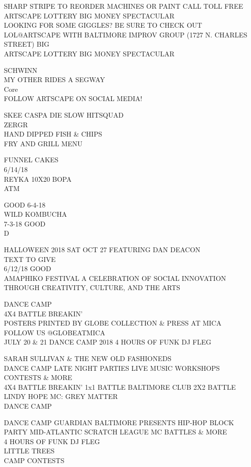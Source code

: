 \documentclass[10pt,letterpaper]{article}
\begin{document}
SHARP STRIPE TO REORDER MACHINES OR PAINT CALL TOLL FREE\\
ARTSCAPE LOTTERY BIG MONEY SPECTACULAR\\
LOOKING FOR SOME GIGGLES?  BE SURE TO CHECK OUT LOL@ARTSCAPE WITH BALTIMORE IMPROV GROUP (1727 N. CHARLES STREET) BIG\\
ARTSCAPE LOTTERY BIG MONEY SPECTACULAR

SCHWINN\\
MY OTHER RIDES A SEGWAY\\
Core\\
FOLLOW ARTSCAPE ON SOCIAL MEDIA!

SKEE CASPA DIE SLOW HITSQUAD\\
ZERGR\\
HAND DIPPED FISH \& CHIPS\\
FRY AND GRILL MENU

FUNNEL CAKES\\
6/14/18\\
REYKA 10X20 BOPA\\
ATM

GOOD 6{-}4{-}18\\
WILD KOMBUCHA\\
7{-}3{-}18 GOOD\\
D

HALLOWEEN 2018 SAT OCT 27 FEATURING DAN DEACON\\
TEXT TO GIVE\\
6/12/18 GOOD\\
AMAPHIKO FESTIVAL A CELEBRATION OF SOCIAL INNOVATION THROUGH CREATIVITY, CULTURE, AND THE ARTS

DANCE CAMP\\
4X4 BATTLE BREAKIN'\\
POSTERS PRINTED BY GLOBE COLLECTION \& PRESS AT MICA FOLLOW US @GLOBEATMICA\\
JULY 20 \& 21 DANCE CAMP 2018 4 HOURS OF FUNK DJ FLEG

SARAH SULLIVAN \& THE NEW OLD FASHIONEDS\\
DANCE CAMP LATE NIGHT PARTIES LIVE MUSIC WORKSHOPS CONTESTS \& MORE\\
4X4 BATTLE BREAKIN' 1x1 BATTLE BALTIMORE CLUB 2X2 BATTLE LINDY HOPE MC: GREY MATTER\\
DANCE CAMP

DANCE CAMP GUARDIAN BALTIMORE PRESENTS HIP{-}HOP BLOCK PARTY MID{-}ATLANTIC SCRATCH LEAGUE MC BATTLES \& MORE\\
4 HOURS OF FUNK DJ FLEG\\
LITTLE TREES\\
CAMP CONTESTS
\end{document}
